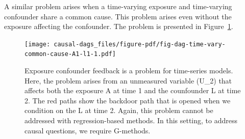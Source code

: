 \documentclass[
  singlecolumn]{report}
\begin{document}
A similar problem arises when a time-varying exposure and time-varying
confounder share a common cause. This problem arises even without the
exposure affecting the confounder. The problem is presented in
Figure~\ref{fig-dag-time-vary-common-cause-A1-l1}.

\begin{figure}

{\centering \texttt{[image: causal-dags\_files/figure-pdf/fig-dag-time-vary-common-cause-A1-l1-1.pdf]}

}

\caption{\label{fig-dag-time-vary-common-cause-A1-l1}Exposure confounder
feedback is a problem for time-series models. Here, the problem arises
from an unmeasured variable (U\_2) that affects both the exposure A at
time 1 and the counfounder L at time 2. The red paths show the backdoor
path that is opened when we condition on the L at time 2. Again, this
problem cannot be addressed with regression-based methods. In this
setting, to address causal questions, we require G-methods.}

\end{figure}
\end{document}
